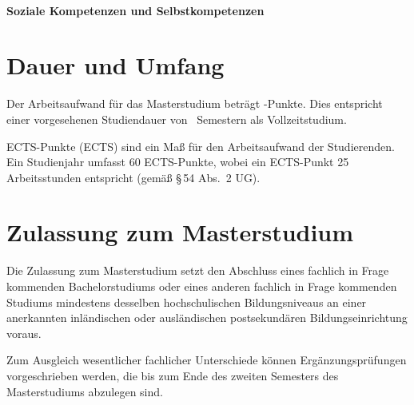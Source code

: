 \paragraph{Soziale Kompetenzen und Selbstkompetenzen}

\section{Dauer und Umfang}\label{sec:DU}

Der Arbeitsaufwand für das Masterstudium \emph{}
beträgt -Punkte. Dies entspricht einer vorgesehenen
Studiendauer von ~Semestern als Vollzeitstudium.

ECTS-Punkte (ECTS) sind ein Maß für den Arbeitsaufwand der Studierenden.
Ein Studienjahr umfasst 60 ECTS-Punkte, wobei ein ECTS-Punkt 25
Arbeitsstunden entspricht (gemäß §\,54 Abs.~2 UG).

\section{Zulassung zum Masterstudium}\label{sec:ZM}

\newcommand*\AuflagenZurHerstellungDerGleichwertigkeit{%
  \ifDEF{VerwendungAuflagen}{%
    \VAR{VerwendungAuflagen}%
  }{}%
}

Die Zulassung zum Masterstudium \emph{} setzt den Abschluss 
eines fachlich in Frage kommenden Bachelorstudiums oder eines anderen 
fachlich in Frage kommenden Studiums mindestens desselben hochschulischen 
Bildungsniveaus an einer anerkannten inländischen oder ausländischen 
postsekundären Bildungseinrichtung voraus. 


Zum Ausgleich wesentlicher fachlicher Unterschiede können 
Ergänzungsprüfungen vorgeschrieben werden, die bis zum Ende 
des zweiten Semesters des Masterstudiums abzulegen sind.

